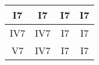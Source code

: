 
\begin{tabular}{| c | c | c | c |}
		\hline
		\phantom{x}I7\phantom{x} & \phantom{x}I7\phantom{x} & \phantom{x}I7\phantom{x} & \phantom{x}I7\phantom{x}  \\
		\hline
		\phantom{x}IV7\phantom{x} & \phantom{x}IV7\phantom{x} & \phantom{x}I7\phantom{x} & \phantom{x}I7\phantom{x}  \\
		\hline
		\phantom{x}V7\phantom{x} & \phantom{x}IV7\phantom{x} & \phantom{x}I7\phantom{x} & \phantom{x}I7\phantom{x}  \\
		\hline
\end{tabular}









